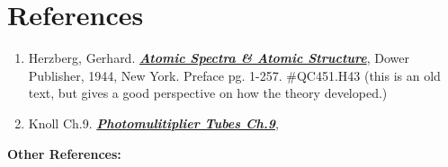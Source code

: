 \documentclass{../lab}
\begin{document}
\section{References}
\label{sec:References}

\begin{enumerate}
    \item Herzberg, Gerhard. \emph{\href{http://physics111.lib.berkeley.edu/Physics111/Reprints/ATM/02-2ndEd-Atomic\_Spectra\_and\_Atomic\_Structure.pdf}{\textbf{Atomic Spectra \& Atomic Structure}}}, Dower Publisher, 1944, New York. Preface pg. 1-257. \#QC451.H43 (this is an old text, but gives a good perspective on how the theory developed.)

    \item Knoll Ch.9. \emph{\href{http://physics111.lib.berkeley.edu/Physics111/Reprints/Knoll-Radiation\%20Detection\%20&\%20Measurement/01-Radiation\_Detection\_and\_Measurement\_CH\_09.pdf}{\textbf{Photomulitiplier Tubes Ch.9}}},

\end{enumerate}

\noindent\textbf{Other References:}
\end{document}
